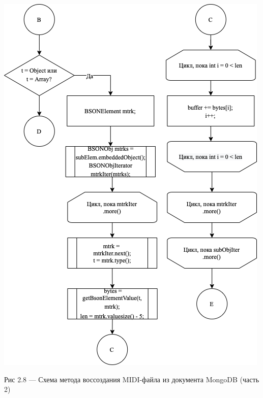 \begin{center}
		\includegraphics[scale=0.7]{tex/img/FileBuilder2.png}
		
			Рис 2.8 — Схема метода воссоздания MIDI-файла из документа MongoDB (часть 2)
\end{center}

